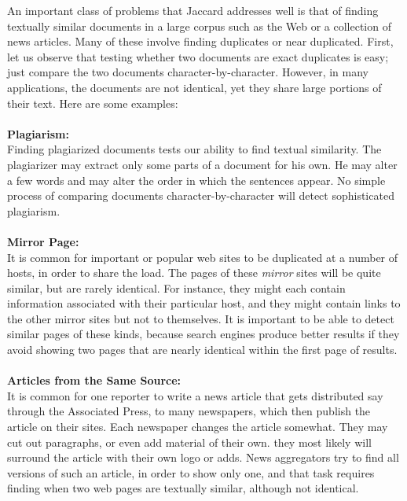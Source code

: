 \documentclass[9pt]{extarticle} %
\begin{document}
\begin{minipage}[t]{.61\linewidth}
An important class of problems that Jaccard addresses well is that of finding textually similar documents in a large corpus such as the Web or a collection of news articles. Many of these involve finding duplicates or near duplicated. First, let us observe that testing whether two documents are exact duplicates is easy; just compare the two documents character-by-character. However, in many applications, the documents are not identical, yet they share large portions of their text. Here are some examples: \\
\\
\textbf{Plagiarism:} \\
Finding plagiarized documents tests our ability to find textual similarity. The plagiarizer may extract only some parts of a document for his own. He may alter a few words and may alter the order in which the sentences appear. No simple process of comparing documents character-by-character will detect sophisticated plagiarism. \\
\\
\textbf{Mirror Page:} \\
It is common for important or popular web sites to be duplicated at a number of hosts, in order to share the load. The pages of these \textit{mirror} sites will be quite similar, but are rarely identical. For instance, they might each contain information associated with their particular host, and they might contain links to the other mirror sites but not to themselves. It is important to be able to detect similar pages of these kinds, because search engines produce better results if they avoid showing two pages that are nearly identical within the first page of results. \\
\\
\textbf{Articles from the Same Source:} \\
It is common for one reporter to write a news article that gets distributed say through the Associated Press, to many newspapers, which then publish the article on their sites. Each newspaper changes the article somewhat. They may cut out paragraphs, or even add material of their own. they most likely will surround the article with their own logo or adds. News aggregators try to find all versions of such an article, in order to show only one, and that task requires finding when two web pages are textually similar, although not identical.  



\end{minipage} %
\end{document}
